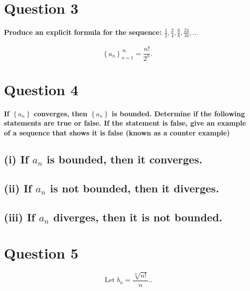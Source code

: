 \section*{Question 3}%
\label{sec:Question 3}

\paragraph{Produce an explicit formula for the sequence: $ \frac{1}{2},\frac{2}{4},\frac{6}{8},\frac{24}{16},\ldots $}

\[
\left\{ a_n \right\} _{ n=1 }^{ \infty }=\frac{ n! }{ 2^{ n } }
.\] 

\section*{Question 4}%
\paragraph{If $ \left\{ a_n \right\}  $ converges, then $ \left\{ a_n \right\}  $ is bounded. Determine if the following statements are true or false. If the statement is false, give an example of a sequence that shows it is false (known as a counter example)}


\subsection*{(i) If $ a_n $ is bounded, then it converges.}%
\subsection*{(ii) If $ a_n $ is not bounded, then it diverges.}%
\subsection*{(iii) If $ a_n $ diverges, then it is not bounded.}%
\section*{Question 5}%
\[
\text{ Let }b_n = \frac{ \sqrt[ n ]{ n! }  }{ n }. 
.\] 
